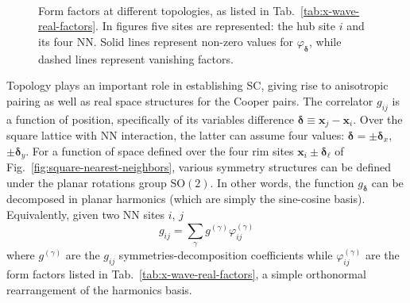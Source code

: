 \begin{figure}
	\centering
	\hspace{2em}
	\\[3em]
	\subfloat[$p_x$-wave.]{
		
		\label{subfig:px-wave-correlator}
	}
	\hspace{2em}
	\subfloat[$p_y$-wave.]{
		
		\label{subfig:py-wave-correlator}
	}
	\hspace{2em}
	\subfloat[$d_{x^2-y^2}$-wave.]{
		
		\label{subfig:d-wave-correlator}
	}
	\caption{Form factors at different topologies, as listed in Tab.~\ref{tab:x-wave-real-factors}. In figures five sites are represented: the hub site $i$ and its four NN. Solid lines represent non-zero values for $\varphi_{\bm{\delta}}$, while dashed lines represent vanishing factors.}
	\label{fig:x-wave-real-factors}
\end{figure}

Topology plays an important role in establishing SC, giving rise to anisotropic pairing as well as real space structures for the Cooper pairs. The correlator $g_{ij}$ is a function of position, specifically of its variables difference $\bm{\delta} \equiv \mathbf{x}_j-\mathbf{x}_i$. Over the square lattice with NN interaction, the latter can assume four values: $\bm{\delta} = \pm \bm{\delta}_x$, $\pm \bm{\delta}_y$. For a function of space defined over the four rim sites $\mathbf{x}_i \pm \bm{\delta}_\ell$ of Fig.~\ref{fig:square-nearest-neighbors}, various symmetry structures can be defined under the planar rotations group $\mathrm{SO}(2)$. In other words, the function $g_{\bm{\delta}}$  can be decomposed in planar harmonics (which are simply the sine-cosine basis). Equivalently, given two NN sites $i$, $j$
\[
	g_{ij} = \sum_\gamma g^{(\gamma)} \varphi_{ij}^{(\gamma)}
\]
where $g^{(\gamma)}$ are the $g_{ij}$ symmetries-decomposition coefficients while $\varphi_{ij}^{(\gamma)}$ are the form factors listed in Tab.~\ref{tab:x-wave-real-factors}, a simple orthonormal rearrangement of the harmonics basis.

